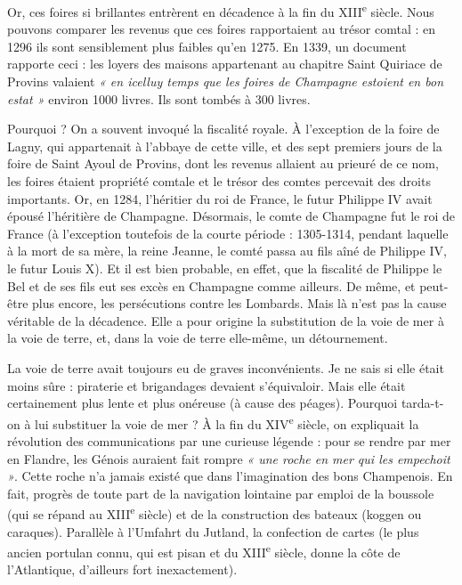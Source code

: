 \documentclass[french,twoside]{book} %
\newcommand{\labelchar}[1]{{\color{rubric}\bf #1}}
\begin{document}
Or, ces foires si brillantes entrèrent en décadence à la fin du XIII\textsuperscript{e} siècle. Nous pouvons comparer les revenus que ces foires rapportaient au trésor comtal : en 1296 ils sont sensiblement plus faibles qu’en 1275. En 1339, un document rapporte ceci : les loyers des maisons appartenant au chapitre Saint Quiriace de Provins valaient \emph{« en icelluy temps que les foires de Champagne estoient en bon estat »} environ 1000 livres. Ils sont tombés à 300 livres.\par
Pourquoi ? On a souvent invoqué la fiscalité royale. À l’exception de la foire de Lagny, qui appartenait à l’abbaye de cette ville, et des sept premiers jours de la foire de Saint Ayoul de Provins, dont les revenus allaient au prieuré de ce nom, les foires étaient propriété comtale et le trésor des comtes percevait des droits importants. Or, en 1284, l’héritier du roi de France, le futur Philippe IV avait épousé l’héritière de Champagne. Désormais, le comte de Champagne fut le roi de France (à l’exception toutefois de la courte période : 1305-1314, pendant laquelle à la mort de sa mère, la reine Jeanne, le comté passa au fils aîné de Philippe IV, le futur Louis X). Et il est bien probable, en effet, que la fiscalité de Philippe le Bel et de ses fils eut ses excès en Champagne comme ailleurs. De même,  
\label{p87} et peut-être plus encore, les persécutions contre les Lombards. Mais là n’est pas la cause véritable de la décadence. Elle a pour origine la substitution de la voie de mer à la voie de terre, et, dans la voie de terre elle-même, un détournement.\par
\bigbreak
\noindent \labelchar{b)} La voie de terre avait toujours eu de graves inconvénients. Je ne sais si elle était moins sûre : piraterie et brigandages devaient s’équivaloir. Mais elle était certainement plus lente et plus onéreuse (à cause des péages). Pourquoi tarda-t-on à lui substituer la voie de mer ? À la fin du XIV\textsuperscript{e} siècle, on expliquait la révolution des communications par une curieuse légende : pour se rendre par mer en Flandre, les Génois auraient fait rompre \emph{« une roche en mer qui les empechoit »}. Cette roche n’a jamais existé que dans l’imagination des bons Champenois. En fait, progrès de toute part de la navigation lointaine par emploi de la boussole (qui se répand au XIII\textsuperscript{e} siècle) et de la construction des bateaux (koggen ou caraques). Parallèle à l’Umfahrt du Jutland, la confection de cartes (le plus ancien portulan connu, qui est pisan et du XIII\textsuperscript{e} siècle, donne la côte de l’Atlantique, d’ailleurs fort inexactement).\par
\end{document}
